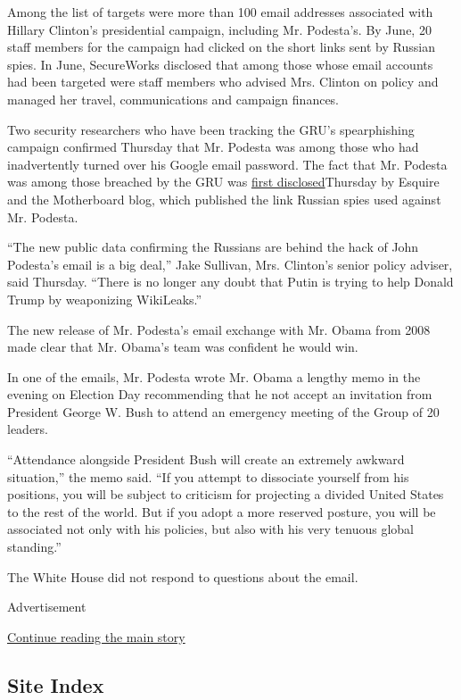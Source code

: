 Among the list of targets were more than 100 email addresses associated
with Hillary Clinton's presidential campaign, including Mr. Podesta's.
By June, 20 staff members for the campaign had clicked on the short
links sent by Russian spies. In June, SecureWorks disclosed that among
those whose email accounts had been targeted were staff members who
advised Mrs. Clinton on policy and managed her travel, communications
and campaign finances.

Two security researchers who have been tracking the GRU's spearphishing
campaign confirmed Thursday that Mr. Podesta was among those who had
inadvertently turned over his Google email password. The fact that Mr.
Podesta was among those breached by the GRU was
\href{http://www.esquire.com/news-politics/a49791/russian-dnc-emails-hacked/}{first
disclosed}Thursday by Esquire and the Motherboard blog, which published
the link Russian spies used against Mr. Podesta.

``The new public data confirming the Russians are behind the hack of
John Podesta's email is a big deal,'' Jake Sullivan, Mrs. Clinton's
senior policy adviser, said Thursday. ``There is no longer any doubt
that Putin is trying to help Donald Trump by weaponizing WikiLeaks.''

The new release of Mr. Podesta's email exchange with Mr. Obama from 2008
made clear that Mr. Obama's team was confident he would win.

In one of the emails, Mr. Podesta wrote Mr. Obama a lengthy memo in the
evening on Election Day recommending that he not accept an invitation
from President George W. Bush to attend an emergency meeting of the
Group of 20 leaders.

``Attendance alongside President Bush will create an extremely awkward
situation,'' the memo said. ``If you attempt to dissociate yourself from
his positions, you will be subject to criticism for projecting a divided
United States to the rest of the world. But if you adopt a more reserved
posture, you will be associated not only with his policies, but also
with his very tenuous global standing.''

The White House did not respond to questions about the email.

Advertisement

\protect\hyperlink{after-bottom}{Continue reading the main story}

\hypertarget{site-index}{%
\subsection{Site Index}\label{site-index}}

